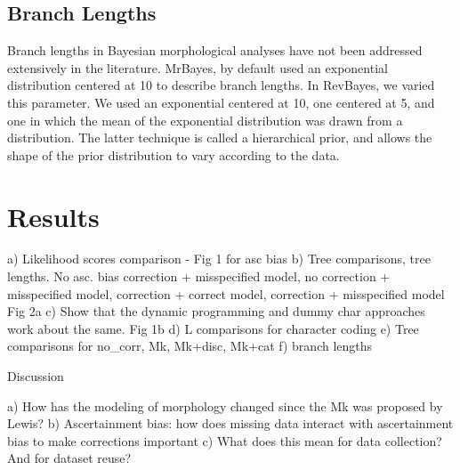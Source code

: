 \documentclass[]{article}
\begin{document}
\subsection{Branch Lengths}

Branch lengths in Bayesian morphological analyses have not been addressed extensively in the literature.
MrBayes, by default used an exponential distribution centered at 10 to describe branch lengths.
In RevBayes, we varied this parameter.
We used an exponential centered at 10, one centered at 5, and one in which the mean of the exponential distribution was drawn from a distribution.
The latter technique is called a hierarchical prior, and allows the shape of the prior distribution to vary according to the data. \par

	
\section{Results}

	a) Likelihood scores comparison - Fig 1 for asc bias
	b) Tree comparisons, tree lengths. No asc. bias correction + misspecified model, no correction + misspecified model, correction + correct model, correction + misspecified model Fig 2a
	c) Show that the dynamic programming and dummy char approaches work about the same. Fig 1b
	d) L comparisons for character coding
	e) Tree comparisons for no\_corr, Mk, Mk+disc, Mk+cat
	f) branch lengths
	
Discussion	

	a) How has the modeling of morphology changed since the Mk was proposed by Lewis?
	b) Ascertainment bias: how does missing data interact with ascertainment bias to make corrections important
	c) What does this mean for data collection? And for dataset reuse?
\end{document}
